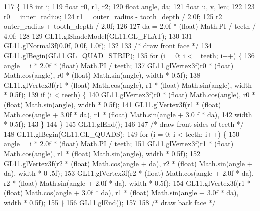 \begin{DoxyCode}
117                                                                                                          \{
118         \textcolor{keywordtype}{int} i;
119         \textcolor{keywordtype}{float} r0, r1, r2;
120         \textcolor{keywordtype}{float} angle, da;
121         \textcolor{keywordtype}{float} u, v, len;
122 
123         r0 = inner\_radius;
124         r1 = outer\_radius - tooth\_depth / 2.0f;
125         r2 = outer\_radius + tooth\_depth / 2.0f;
126 
127         da = 2.0f * (float) Math.PI / teeth / 4.0f;
128 
129         GL11.glShadeModel(GL11.GL\_FLAT);
130 
131         GL11.glNormal3f(0.0f, 0.0f, 1.0f);
132 
133         \textcolor{comment}{/* draw front face */}
134         GL11.glBegin(GL11.GL\_QUAD\_STRIP);
135         \textcolor{keywordflow}{for} (i = 0; i <= teeth; i++) \{
136             angle = i * 2.0f * (float) Math.PI / teeth;
137             GL11.glVertex3f(r0 * (\textcolor{keywordtype}{float}) Math.cos(angle), r0 * (float) Math.sin(angle), width * 0.5f);
138             GL11.glVertex3f(r1 * (\textcolor{keywordtype}{float}) Math.cos(angle), r1 * (float) Math.sin(angle), width * 0.5f);
139             \textcolor{keywordflow}{if} (i < teeth) \{
140                 GL11.glVertex3f(r0 * (\textcolor{keywordtype}{float}) Math.cos(angle), r0 * (float) Math.sin(angle), width * 0.5f);
141                 GL11.glVertex3f(r1 * (\textcolor{keywordtype}{float}) Math.cos(angle + 3.0f * da), r1 * (float) Math.sin(angle + 3.0
      f * da),
142                                                 width * 0.5f);
143             \}
144         \}
145         GL11.glEnd();
146 
147         \textcolor{comment}{/* draw front sides of teeth */}
148         GL11.glBegin(GL11.GL\_QUADS);
149         \textcolor{keywordflow}{for} (i = 0; i < teeth; i++) \{
150             angle = i * 2.0f * (float) Math.PI / teeth;
151             GL11.glVertex3f(r1 * (\textcolor{keywordtype}{float}) Math.cos(angle), r1 * (float) Math.sin(angle), width * 0.5f);
152             GL11.glVertex3f(r2 * (\textcolor{keywordtype}{float}) Math.cos(angle + da), r2 * (float) Math.sin(angle + da), width * 0
      .5f);
153             GL11.glVertex3f(r2 * (\textcolor{keywordtype}{float}) Math.cos(angle + 2.0f * da), r2 * (float) Math.sin(angle + 2.0f * 
      da), width * 0.5f);
154             GL11.glVertex3f(r1 * (\textcolor{keywordtype}{float}) Math.cos(angle + 3.0f * da), r1 * (float) Math.sin(angle + 3.0f * 
      da), width * 0.5f);
155         \}
156         GL11.glEnd();
157 
158         \textcolor{comment}{/* draw back face */}

\end{DoxyCode}
